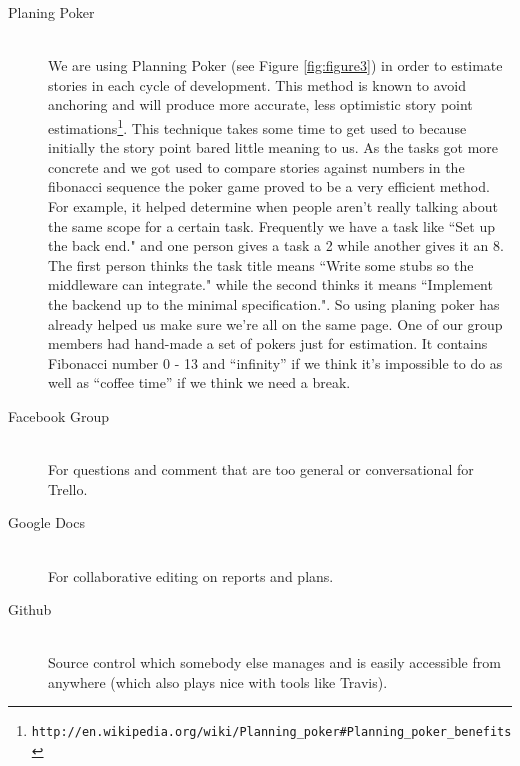 \documentclass[11pt, a4paper]{article}
\begin{document}
\begin{description}
  \item[Planing Poker] \hfill \\
We are using Planning Poker (see Figure \ref{fig:figure3}) in order to estimate stories in each cycle of development. This method is known to avoid anchoring and will produce more accurate, less optimistic story point estimations\footnote{\tt{http://en.wikipedia.org/wiki/Planning\_poker\#Planning\_poker\_benefits}}. This technique takes some time to get used to because initially the story point bared little meaning to us. As the tasks got more concrete and we got used to compare stories against numbers in the fibonacci sequence the poker game proved to be a very efficient method. 
For example, it helped determine when people aren't really talking about the same scope for a certain task. Frequently we have a task like ``Set up the back end." and one person gives a task a 2 while another gives it an 8. The first person thinks the task title means ``Write some stubs so the middleware can integrate." while the second thinks it means ``Implement the backend up to the minimal specification.". So using planing poker has already helped us make sure we're all on the same page. One of our group members had hand-made a set of pokers just for estimation. It contains Fibonacci number 0 - 13 and ``infinity'' if we think it's impossible to do as well as ``coffee time'' if we think we need a break. 
 
  \item[Facebook Group] \hfill \\
  For questions and comment that are too general or conversational for Trello.
  \item[Google Docs] \hfill \\
  For collaborative editing on reports and plans.
  \item[Github] \hfill \\
  Source control which somebody else manages and is easily accessible from anywhere
  (which also plays nice with tools like Travis).



\end{description}
\end{document}
